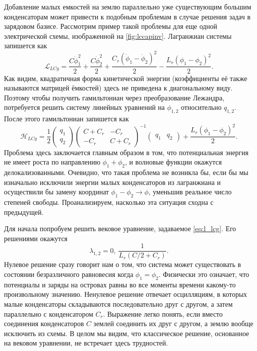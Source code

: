 \documentclass[14pt, a4paper]{extreport}
\numberwithin{equation}{section}
\begin{document}
Добавление малых емкостей на землю параллельно уже существующим большим конденсаторам может привести к подобным проблемам в случае решения задач в зарядовом базисе. Рассмотрим пример такой проблемы для еще одной электрической схемы, изображенной на \autoref{fig:lccapinv}. Лагранжиан системы запишется как
\begin{equation}
	\mathcal{L}_{LCg} = \frac{C \dot \phi_1^2}{2} + \frac{C \dot \phi_2^2}{2} + \frac{C_r\left(\dot\phi_1 - \dot\phi_2\right)^2}{2} - \frac{L_r \left(\phi_1  - \phi_2\right)^2}{2}.\label{eq:l_lcg}
\end{equation}
Как видим, квадратичная форма кинетической энергии (коэффициенты её также называются матрицей ёмкостей) здесь не приведена к диагональному виду. Поэтому чтобы получить гамильтониан через преобразование Лежандра, потребуется решить систему линейных уравнений на $\phi_{1,2}$ относительно $q_{1,2}$. После этого гамильтониан запишется как 
\begin{equation}
	\mathcal{H}_{LCg} = \frac{1}{2} \left(\begin{matrix} q_1\\q_2\end{matrix}\right) \left(\begin{matrix}
	C+C_r & -C_r \\
	-C_r & C+C_r
	\end{matrix}\right)^{-1}\left(\begin{matrix} q_1&q_2\end{matrix}\right)+\frac{L_r \left(\phi_1  - \phi_2\right)^2}{2}.
\end{equation}
Проблема здесь заключается главным образом в том, что потенциальная энергия не имеет роста по направлению $\phi_1 + \phi_2$, и волновые функции окажутся делокализованными. Очевидно, что такая проблема не возникла бы, если бы мы изначально исключили энергии малых конденсаторов из лагранжиана и осуществили бы замену координат $\phi_1 - \phi_2 \rightarrow \phi$, уменьшив реальное число степеней свободы. Проанализируем, насколько эта ситуация сходна с предыдущей.

Для начала попробуем решить вековое уравнение, задаваемое \eqref{eq:l_lcg}. Его решениями окажутся
\begin{equation}
	\lambda_{1,2} = 0,\ \frac {1}{L_r \left( C/2 + C_r \right) }.	
\end{equation}
Нулевое решение сразу говорит нам о том, что система может существовать в состоянии безразличного равновесия когда $\phi_1 = \phi_2$. Физически это означает, что потенциалы и заряды на островах равны во все моменты времени какому-то произвольному значению. Ненулевое решение отвечает осцилляциям, в которых малые конденсаторы складываются последовательно друг с другом, а затем параллельно с конденсатором $C_r$. Выражение легко понять, если вместо соединения конденсаторов $C$ землей соединить их друг с другом, а землю вообще исключить из схемы. В целом мы видим, что классическое решение, основанное на вековом уравнении, не встречает здесь трудностей.
\end{document}

